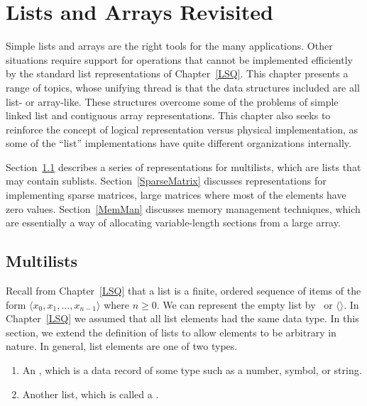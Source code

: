 
\chapter{Lists and Arrays Revisited}
\label{ReList}
\def\CHHEAD{Chap.\ \thechapter\ Lists and Arrays Revisited}    %

Simple lists and arrays are the right tools for the many
applications.
Other situations require support for operations that cannot be
implemented efficiently by the standard list representations of
Chapter~\ref{LSQ}.
This chapter presents a range of topics, whose unifying thread is that
the data structures included are all list- or array-like.
These structures overcome some of the problems of simple linked
list and contiguous array representations.
This chapter also seeks to reinforce the concept of logical
representation versus
physical implementation,
as some of the ``list'' implementations have quite different
organizations internally.

Section~\ref{Multilists} describes a series of
representations for multilists, which are lists that may contain
sublists.
Section~\ref{SparseMatrix} discusses representations
for implementing sparse matrices, large
matrices where most of the elements have zero values.
Section~\ref{MemMan} discusses memory management
techniques, which are essentially a way of allocating variable-length
sections from a large array.

\section{Multilists}
\label{Multilists}

Recall from Chapter~\ref{LSQ} that a list is a finite, ordered
sequence of items of the form
\(\langle x_0, x_1, ..., x_{n-1}\rangle\) where \(n \geq 0\).
We can represent the empty list by \NULL\ or \(\langle \rangle\).
In Chapter~\ref{LSQ} we assumed that all list elements had the same
data type.
In this section, we extend the definition of lists to allow elements
to be arbitrary in nature.
In general, list elements are one of two types.

\begin{enumerate}

\item
An , which is a data record of some type such as a number,
symbol, or string.

\item
Another list, which is called a .

\end{enumerate}

